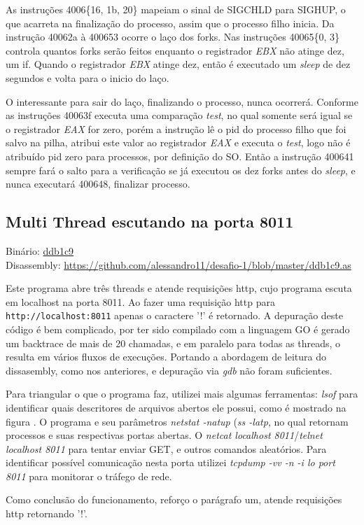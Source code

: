 As instruções 4006\{16, 1b, 20\} mapeiam o sinal de SIGCHLD para
SIGHUP, o que acarreta na finalização do processo, assim que o processo
filho inicia. Da instrução 40062a à 400653 ocorre o laço dos
forks. Nas instruções 40065\{0, 3\} controla quantos forks serão
feitos enquanto o registrador \emph{EBX} não atinge dez, um if. Quando o
registrador \emph{EBX} atinge dez, então é executado um \emph{sleep} de dez
segundos e volta para o inicio do laço.

O interessante para sair do laço, finalizando o processo, nunca
ocorrerá. Conforme as instruções 40063f executa uma comparação
\emph{test}, no qual somente será igual se o registrador \emph{EAX} for zero,
porém a instrução lê o pid do processo filho que foi salvo na pilha,
atribui este valor ao registrador \emph{EAX} e executa o \emph{test}, logo
não é atribuído pid zero para processos, por definição do SO. Então a
instrução 400641 sempre fará o salto para a verificação se já executou
os dez forks antes do \emph{sleep}, e nunca executará 400648,
finalizar processo.


\subsection{Multi Thread escutando na porta 8011}
\noindent Binário: \href{https://s3.amazonaws.com/chaordic-desafio-cloud/ddb1c9}{ddb1c9}\\
Disassembly:
\href{https://github.com/alessandro11/desafio-1/blob/master/ddb1c9.as}{https://github.com/alessandro11/desafio-1/blob/master/ddb1c9.as}\\

\par Este programa abre três threads e atende requisições http,
cujo programa escuta em localhost na porta 8011. Ao fazer uma
requisição http para \texttt{http://localhost:8011} apenas o caractere
'!' é retornado. A depuração deste código é bem complicado, por ter
sido compilado com a linguagem GO é gerado um backtrace de mais de 20
chamadas, e em paralelo para todas as threads, o resulta em vários
fluxos de execuções. Portando a abordagem de leitura do dissasembly,
como nos anteriores, e depuração via \emph{gdb} não foram
suficientes.

Para triangular o que o programa faz, utilizei mais algumas
ferramentas: \emph{lsof} para identificar quais descritores de
arquivos abertos ele possui, como é mostrado na figura . O programa e seu parâmetros \emph{netstat -natup}
(\emph{ss -latp}, no qual retornam processos e suas respectivas portas
abertas. O \emph{netcat localhost 8011}/\emph{telnet localhost 8011}
para tentar enviar GET, e outros comandos aleatórios. Para identificar
possível comunicação nesta porta utilizei \emph{tcpdump -vv -n -i lo
  port 8011} para monitorar o tráfego de rede.

Como conclusão do funcionamento, reforço o parágrafo um, atende
requisições http retornando '!'.
